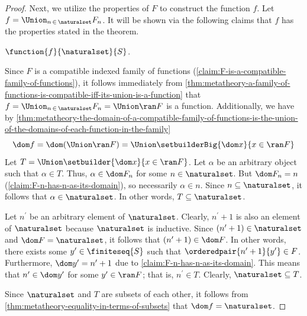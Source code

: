 \begin{proof}
    \vspace{0.3cm}
    \noindent
    Next, we utilize the properties of \( F \) to construct the function \( f \).
    Let \( f = \Union_{n \,\in\, \naturalset} F_{n} \).
    It will be shown via the following claims that \( f \) has the properties stated in the theorem.
    \begin{claim}
        \( \function{f}{\naturalset}{S} \).
    \end{claim}
    \noindent
    Since \( F \) is a compatible indexed family of functions (\cref{claim:F-is-a-compatible-family-of-functions}),
    it follows immediately from \cref{thm:metatheory-a-family-of-functions-is-compatible-iff-its-union-is-a-function} that
    \( f = \Union_{n \,\in\, \naturalset} F_{n} = \Union \ran F \) is a function.
    Additionally, we have by \cref{thm:metatheory-the-domain-of-a-compatible-family-of-functions-is-the-union-of-the-domains-of-each-function-in-the-family}
    \begin{equation*}
        \dom f = \dom \mleft( \Union \ran F \mright) = \Union \setbuilderBig{\dom x}{x \in \ran F}
    \end{equation*}
    Let \( T = \Union \setbuilder{\dom x}{x \in \ran F} \).
    Let \( \alpha \) be an arbitrary object such that \( \alpha \in T \).
    Thus, \( \alpha \in \dom F_{n} \) for some \( n \in \naturalset \).
    But \( \dom F_{n} = n \) (\cref{claim:F-n-has-n-as-its-domain}), so necessarily \( \alpha \in n \).
    Since \( n \subseteq \naturalset \), it follows that \( \alpha \in \naturalset \).
    In other words, \( T \subseteq \naturalset \).

    \vspace{0.3cm}
    \noindent
    Let \( n^{\prime} \) be an arbitrary element of \( \naturalset \).
    Clearly, \( n^{\prime} + 1 \) is also an element of \( \naturalset \) because \( \naturalset \) is inductive.
    Since \( \mleft( n^{\prime} + 1 \mright) \in \naturalset \) and \( \dom F = \naturalset \), it follows that
    \( \mleft( n^{\prime} + 1 \mright) \in \dom F \).
    In other words, there exists some \( y^{\prime} \in \finiteseq{S} \) such that \( \orderedpair{n^{\prime} + 1}{y^{\prime}} \in F \).
    Furthermore, \( \dom y^{\prime} = n^{\prime} + 1 \) due to \cref{claim:F-n-has-n-as-its-domain}.
    This means that \( n^{\prime} \in \dom y^{\prime} \) for some \( y^{\prime} \in \ran F \); that is, \( n^{\prime} \in T \).
    Clearly, \( \naturalset \subseteq T \).

    \vspace{0.3cm}
    \noindent
    Since \( \naturalset \) and \( T \) are subsets of each other, it follows from \cref{thm:metatheory-equality-in-terms-of-subsets} that
    \( \dom f = \naturalset \).


\end{proof}
